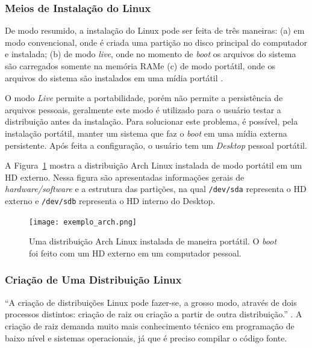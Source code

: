 \documentclass[
article,			%
12pt,				%
openright,			%
oneside,			%
a4paper,			%
chapter=TITLE,		%
section=TITLE,		%
subsection=TITLE,	%
subsubsection=TITLE,%
subsubsubsection=TITLE, %
english,			%
brazil,				%
]{abntex2}
\def\code#1{\texttt{#1}}
\begin{document}
\subsubsection{Meios de Instalação do Linux}

De modo resumido, a instalação do Linux pode ser feita de três
maneiras: (a) em modo convencional, onde é criada uma partição no
disco principal do computador e instalada; (b) de modo \emph{live},
onde no momento de \emph{boot} os arquivos do sistema são carregados
somente na memória RAM\@ e (c) de modo portátil, onde os arquivos do
sistema são instalados em uma mídia portátil \cite{Nunes2009}.

O modo \emph{Live} permite a portabilidade, porém não permite a
persistência de arquivos pessoais, geralmente este modo é utilizado
para o usuário testar a distribuição antes da instalação. Para
solucionar este problema, é possível, pela instalação portátil, manter
um sistema que faz o \emph{boot} em uma mídia externa persistente.
Após feita a configuração, o usuário tem um \emph{Desktop} pessoal
portátil.

A Figura~\ref{fig:exemplo-distro} mostra a distribuição Arch Linux
instalada de modo portátil em um HD externo. Nessa figura são
apresentadas informações gerais de \emph{hardware/software} e a
estrutura das partições, na qual \code{/dev/sda} representa o HD
externo e \code{/dev/sdb} representa o HD interno do Desktop.

\begin{figure}[H]
    \caption{\label{fig:exemplo-distro}Uma distribuição Arch Linux
        instalada de maneira portátil. O \emph{boot} foi feito com um HD
    externo em um computador pessoal.}
    \begin{center}
        \texttt{[image: exemplo\_arch.png]}
    \end{center}
\end{figure}

\subsubsection{Criação de Uma Distribuição Linux}

``A criação  de  distribuições  Linux pode fazer-se, a grosso modo,
através  de  dois processos distintos: criação de raiz ou criação a
partir de outra distribuição.'' \cite[p.  78]{Nunes2009}. A criação de
raiz demanda muito mais conhecimento técnico em programação de baixo
nível e sistemas operacionais, já que é preciso compilar o código
fonte.
\end{document}
